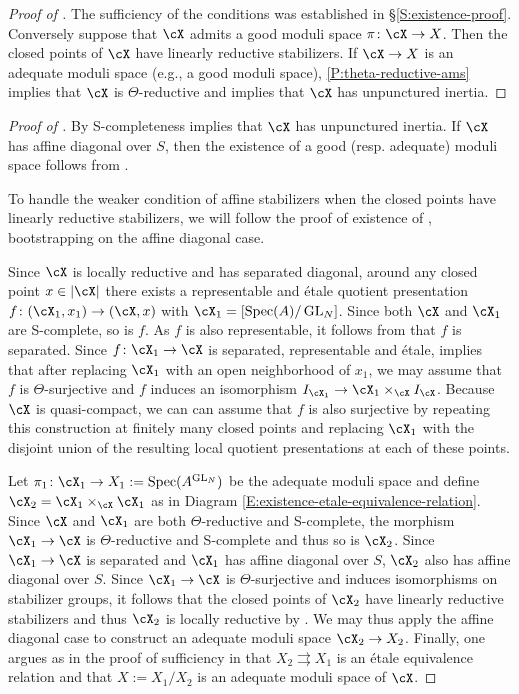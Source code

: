 \documentclass[a4paper]{amsart}
\numberwithin{equation}{section}
\theoremstyle{plain}
\theoremstyle{definition}
\DeclareMathOperator{\Spec}{Spec}
\DeclareMathOperator{\GL}{GL}
\newcommand{\co}{\colon}
\def\Scomplete{\textsf{S}-complete}
\begin{document}
\begin{proof}[Proof of ]
		The sufficiency of the conditions was established in \S \ref{S:existence-proof}.
		Conversely suppose that $\cX$ admits a good moduli space $\pi \co \cX \to X$. Then the closed points of $\cX$ have linearly reductive stabilizers. If $\cX \to X$ is an adequate moduli space (e.g., a good moduli space), \eqref{P:theta-reductive-ams} implies that $\cX$ is $\Theta$-reductive and  implies that $\cX$ has unpunctured inertia.
\end{proof}

\begin{proof}[Proof of ]
By  \Scomplete ness implies that $\cX$ has unpunctured inertia. If $\cX$ has affine diagonal over $S$, then the existence of a good (resp. adequate) moduli space follows from . 

To handle the weaker condition of affine stabilizers when the closed points have linearly reductive stabilizers, we will follow the proof of existence of , bootstrapping on the affine diagonal case.

Since $\cX$ is locally reductive and has separated diagonal, around any closed point $x \in |\cX|$ there exists a representable and \'etale quotient presentation $f \co (\cX_1, x_1) \to (\cX,x)$ with $\cX_1=[\Spec(A) / \GL_N]$. Since both $\cX$ and $\cX_1$ are \Scomplete, so is $f$.  As $f$ is also representable, it follows from  that $f$ is separated. Since $f \co \cX_1 \to \cX$ is separated, representable and \'etale,   implies that after replacing $\cX_1$ with an open neighborhood of $x_1$, we may assume that $f$ is $\Theta$-surjective and $f$ induces an isomorphism $I_{\cX_1} \to \cX_1 \times_{\cX} I_{\cX}$. Because $\cX$ is quasi-compact, we can can assume that $f$ is also surjective by repeating this construction at finitely many closed points and replacing $\cX_1$ with the disjoint union of the resulting local quotient presentations at each of these points.

Let $\pi_1 \co \cX_1 \to X_1 := \Spec(A^{\GL_N})$ be the adequate moduli space and define $\cX_2 = \cX_1 \times_{\cX} \cX_1$ as in Diagram \eqref{E:existence-etale-equivalence-relation}.  Since $\cX$ and $\cX_1$ are both $\Theta$-reductive and \textsf{S}-complete, the morphism  $\cX_1 \to \cX$ is $\Theta$-reductive and \textsf{S}-complete and thus so is $\cX_2$. Since $\cX_1 \to \cX$ is separated and $\cX_1$ has affine diagonal over $S$, $\cX_2$ also has affine diagonal over $S$. Since $\cX_1 \to \cX$ is $\Theta$-surjective and induces isomorphisms on stabilizer groups, it follows that the closed points of $\cX_2$ have linearly reductive stabilizers and thus $\cX_2$ is locally reductive by . We may thus apply the affine diagonal case to construct an adequate moduli space $\cX_2 \to X_2$.  Finally, one argues as in the proof of sufficiency in  that $X_2 \rightrightarrows X_1$ is an \'etale equivalence relation and that $X:=X_1/X_2$ is an adequate moduli space of $\cX$.


\end{proof}
\end{document}
